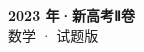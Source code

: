\documentclass[zihao=-4, a4paper]{ctexart}
\begin{document}
\begin{center}
  {\Large\bfseries 2023 年·新高考Ⅱ卷}\\[4pt]
  {\large 数学 · 试题版}
\end{center}
\medskip
{}

\end{document}
